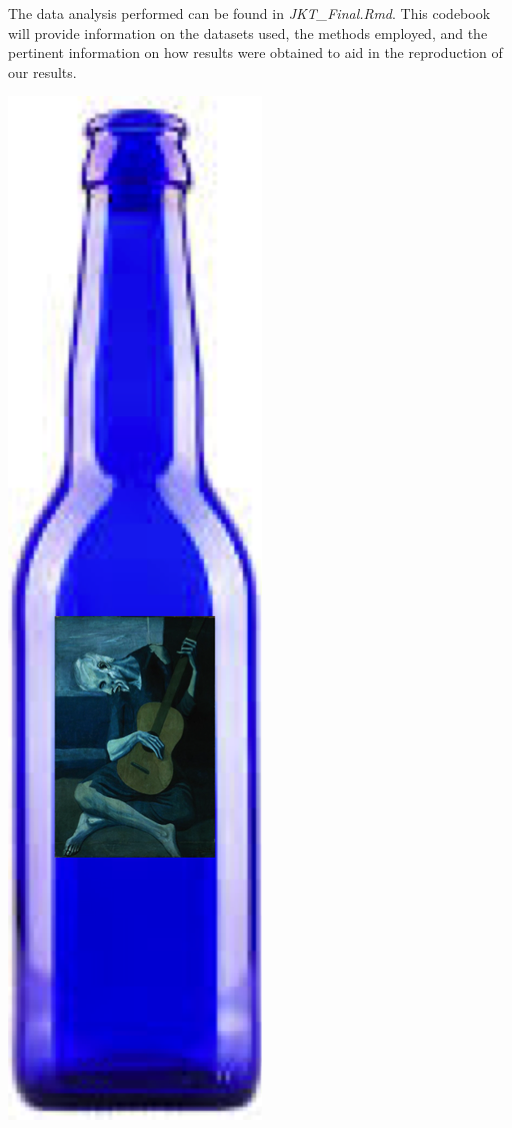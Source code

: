 \documentclass{report}
\begin{document}
\noindent The data analysis performed can be found in \emph{JKT_Final.Rmd}. This codebook will provide information on the datasets used, the methods employed, and the pertinent information on how results were obtained to aid in the reproduction of our results. 
\begin{center}

\includegraphics[scale=.5]{../graphics/beer2}

\end{center}
\end{document}
